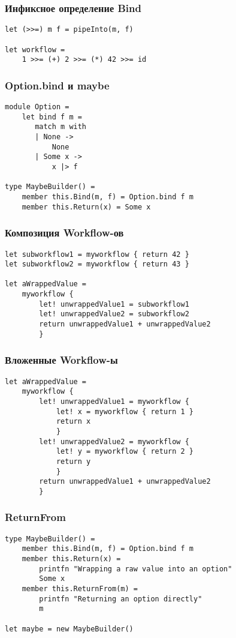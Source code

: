 \documentclass[xetex,mathserif,serif]{beamer}
\begin{document}
	\begin{frame}[fragile]
		\frametitle{Инфиксное определение Bind}
		\begin{verbatim}
let (>>=) m f = pipeInto(m, f)

let workflow = 
    1 >>= (+) 2 >>= (*) 42 >>= id
		\end{verbatim}
\end{frame}

	\begin{frame}[fragile]
		\frametitle{Option.bind и maybe}
		\begin{verbatim}
module Option = 
    let bind f m =
       match m with
       | None -> 
           None
       | Some x -> 
           x |> f 

type MaybeBuilder() =
    member this.Bind(m, f) = Option.bind f m
    member this.Return(x) = Some x
		\end{verbatim}
\end{frame}

	\begin{frame}[fragile]
		\frametitle{Композиция Workflow-ов}
		\begin{verbatim}
let subworkflow1 = myworkflow { return 42 }
let subworkflow2 = myworkflow { return 43 }

let aWrappedValue = 
    myworkflow {
        let! unwrappedValue1 = subworkflow1
        let! unwrappedValue2 = subworkflow2
        return unwrappedValue1 + unwrappedValue2
        }
		\end{verbatim}
\end{frame}

	\begin{frame}[fragile]
		\frametitle{Вложенные Workflow-ы}
		\begin{verbatim}
let aWrappedValue = 
    myworkflow {
        let! unwrappedValue1 = myworkflow {
            let! x = myworkflow { return 1 }
            return x
            }
        let! unwrappedValue2 = myworkflow {
            let! y = myworkflow { return 2 }
            return y
            }
        return unwrappedValue1 + unwrappedValue2
        }
		\end{verbatim}
\end{frame}

	\begin{frame}[fragile]
		\frametitle{ReturnFrom}
		\begin{verbatim}
type MaybeBuilder() =
    member this.Bind(m, f) = Option.bind f m
    member this.Return(x) = 
        printfn "Wrapping a raw value into an option"
        Some x
    member this.ReturnFrom(m) = 
        printfn "Returning an option directly"
        m

let maybe = new MaybeBuilder()
		\end{verbatim}
\end{frame}
\end{document}
